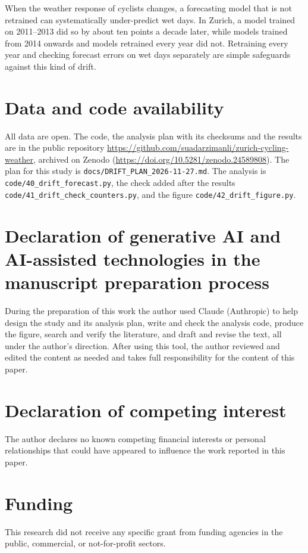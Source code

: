 \documentclass[preprint,12pt,authoryear]{elsarticle}
\begin{document}
When the weather response of cyclists changes, a forecasting model that is not retrained can systematically under-predict wet days. In Zurich, a model trained on 2011--2013 did so by about ten points a decade later, while models trained from 2014 onwards and models retrained every year did not. Retraining every year and checking forecast errors on wet days separately are simple safeguards against this kind of drift.

\section*{Data and code availability}

All data are open. The code, the analysis plan with its checksums and the results are in the public repository \url{https://github.com/suadarzimanli/zurich-cycling-weather}, archived on Zenodo (\url{https://doi.org/10.5281/zenodo.24589808}). The plan for this study is \nolinkurl{docs/DRIFT_PLAN_2026-11-27.md}. The analysis is \nolinkurl{code/40_drift_forecast.py}, the check added after the results \nolinkurl{code/41_drift_check_counters.py}, and the figure \nolinkurl{code/42_drift_figure.py}.

\section*{Declaration of generative AI and AI-assisted technologies in the\\manuscript preparation process}

During the preparation of this work the author used Claude (Anthropic) to help design the study and its analysis plan, write and check the analysis code, produce the figure, search and verify the literature, and draft and revise the text, all under the author's direction. After using this tool, the author reviewed and edited the content as needed and takes full responsibility for the content of this paper.

\section*{Declaration of competing interest}

The author declares no known competing financial interests or personal relationships that could have appeared to influence the work reported in this paper.

\section*{Funding}

This research did not receive any specific grant from funding agencies in the public, commercial, or not-for-profit sectors.



\end{document}
